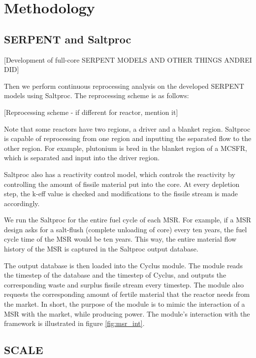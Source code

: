 \section{Methodology}


\subsection{SERPENT and Saltproc}
[Development of full-core SERPENT MODELS AND OTHER THINGS ANDREI DID]

Then we perform continuous reprocessing analysis on the developed
SERPENT models using Saltproc. The reprocessing scheme is as follows:

[Reprocessing scheme - if different for reactor, mention it]

Note that some reactors have two regions, a driver and a blanket region.
Saltproc is capable of reprocessing from one region and inputting
the separated flow to the other region. For example, plutonium is bred
in the blanket region of a MCSFR, which is separated and input into
the driver region. 

Saltproc also has a reactivity control model, which controls the reactivity
by controlling the amount of fissile material put into the core. At
every depletion step, the k-eff value is checked and modifications
to the fissile stream is made accordingly.


We run the Saltproc for the entire fuel cycle of each \gls{MSR}. For example,
if a \gls{MSR} design asks for a salt-flush (complete unloading of core)
every ten years, the fuel cycle time of the \gls{MSR} would be ten years.
This way, the entire material flow history of the \gls{MSR} is captured
in the Saltproc output database.

The output database is then loaded into the Cyclus module.
The module reads the timestep of the database and the timestep of Cyclus,
and outputs the corresponding waste and surplus fissile stream every timestep.
The module also requests the corresponding amount of fertile material
that the reactor needs from the market. In short, the purpose of the module is to
mimic the interaction of a \gls{MSR} with the market, while producing
power. The module's interaction with the framework is illustrated in
figure \ref{fig:msr_int}.



\subsection{SCALE}



